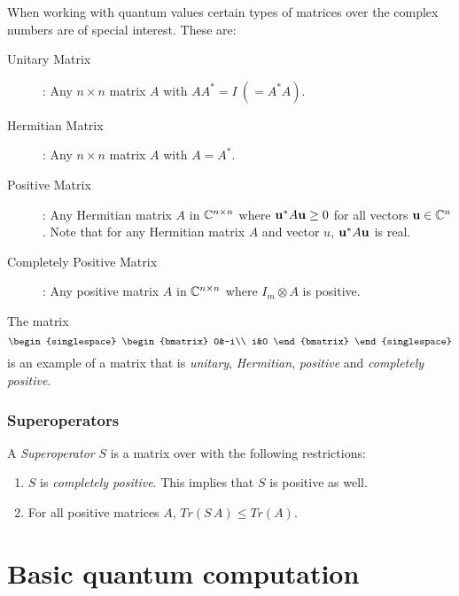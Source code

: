 When working with quantum values certain types of matrices over the complex numbers are of special
interest. These are:
\begin{description}
  \item[Unitary Matrix]: Any $n \times n$  matrix $A$ with $A A^{*} = I\ (= A^{*} A)$.
  \item[Hermitian Matrix]: Any  $n \times n$ matrix $A$ with $A=A^{*}$.
  \item[Positive Matrix]: Any Hermitian matrix $A$ in  $\mathbb{C}^{n\times n}$
    where $\mathbf{u}^{*} A \mathbf{u} \ge 0$ for all vectors  $\mathbf{u}\in \mathbb{C}^n$. Note
    that for any Hermitian matrix $A$ and vector $u$,  $\mathbf{u}^{*} A \mathbf{u}$ is real.
  \item[Completely Positive Matrix]: Any positive matrix $A$ in  $\mathbb{C}^{n\times n}$
    where $I_m \otimes A$ is positive.
\end{description}
The matrix
  \[
    {\begin{singlespace}
      \begin{bmatrix}
        0&-i\\
        i&0
      \end{bmatrix}
    \end{singlespace}}
  \]
is an example of a matrix that is \emph{unitary}, \emph{Hermitian}, \emph{positive} and
\emph{completely positive}.



\subsubsection{Superoperators} %
\label{ssub:superoperators}

A \emph{Superoperator} $S$ is a matrix over \complex{} with the following restrictions:
\begin{enumerate}
  \item{} $S$ is \emph{completely positive}. This implies that $S$ is positive as well.
  \item{} For all positive matrices $A$, $Tr(S\,A) \leq Tr(A)$.
\end{enumerate}



\section{Basic quantum computation} %
\label{sec:basic_quantum_computation}

